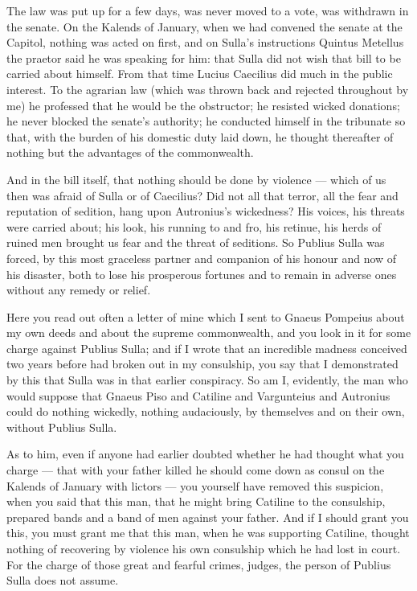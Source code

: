  The law was put up for a few days, was never moved to a vote, was withdrawn in the senate. On the Kalends of January, when we had convened the senate at the Capitol, nothing was acted on first, and on Sulla's instructions Quintus Metellus the praetor said he was speaking for him: that Sulla did not wish that bill to be carried about himself. From that time Lucius Caecilius did much in the public interest. To the agrarian law (which was thrown back and rejected throughout by me) he professed that he would be the obstructor; he resisted wicked donations; he never blocked the senate's authority; he conducted himself in the tribunate so that, with the burden of his domestic duty laid down, he thought thereafter of nothing but the advantages of the commonwealth.

 And in the bill itself, that nothing should be done by violence --- which of us then was afraid of Sulla or of Caecilius? Did not all that terror, all the fear and reputation of sedition, hang upon Autronius's wickedness? His voices, his threats were carried about; his look, his running to and fro, his retinue, his herds of ruined men brought us fear and the threat of seditions. So Publius Sulla was forced, by this most graceless partner and companion of his honour and now of his disaster, both to lose his prosperous fortunes and to remain in adverse ones without any remedy or relief.

 Here you read out often a letter of mine which I sent to Gnaeus Pompeius about my own deeds and about the supreme commonwealth, and you look in it for some charge against Publius Sulla; and if I wrote that an incredible madness conceived two years before had broken out in my consulship, you say that I demonstrated by this that Sulla was in that earlier conspiracy. So am I, evidently, the man who would suppose that Gnaeus Piso and Catiline and Vargunteius and Autronius could do nothing wickedly, nothing audaciously, by themselves and on their own, without Publius Sulla.

 As to him, even if anyone had earlier doubted whether he had thought what you charge --- that with your father killed he should come down as consul on the Kalends of January with lictors --- you yourself have removed this suspicion, when you said that this man, that he might bring Catiline to the consulship, prepared bands and a band of men against your father. And if I should grant you this, you must grant me that this man, when he was supporting Catiline, thought nothing of recovering by violence his own consulship which he had lost in court. For the charge of those great and fearful crimes, judges, the person of Publius Sulla does not assume.

